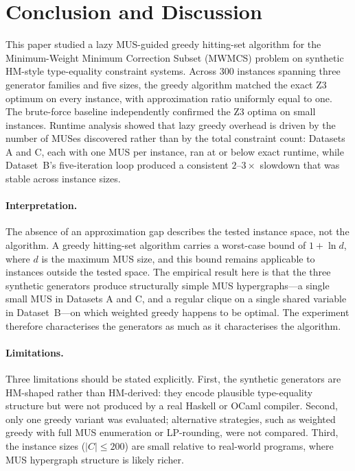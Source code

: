 \section{Conclusion and Discussion}

This paper studied a lazy MUS-guided greedy hitting-set algorithm for the
Minimum-Weight Minimum Correction Subset (MWMCS) problem on synthetic
HM-style type-equality constraint systems. Across 300 instances spanning three
generator families and five sizes, the greedy algorithm matched the exact Z3
optimum on every instance, with approximation ratio uniformly equal to one.
The brute-force baseline independently confirmed the Z3 optima on small
instances. Runtime analysis showed that lazy greedy overhead is driven by the
number of MUSes discovered rather than by the total constraint count: Datasets
A and C, each with one MUS per instance, ran at or below exact runtime, while
Dataset~B's five-iteration loop produced a consistent $2$--$3\times$ slowdown
that was stable across instance sizes.

\paragraph{Interpretation.}
The absence of an approximation gap describes the tested instance space, not
the algorithm. A greedy hitting-set algorithm carries a worst-case bound of
$1 + \ln d$, where $d$ is the maximum MUS size, and this bound remains
applicable to instances outside the tested space. The empirical result here
is that the three synthetic generators produce structurally simple MUS
hypergraphs---a single small MUS in Datasets A and C, and a regular clique
on a single shared variable in Dataset~B---on which weighted greedy happens
to be optimal. The experiment therefore characterises the generators as much
as it characterises the algorithm.

\paragraph{Limitations.}
Three limitations should be stated explicitly. First, the synthetic
generators are HM-shaped rather than HM-derived: they encode plausible
type-equality structure but were not produced by a real Haskell or OCaml
compiler. Second, only one greedy variant was evaluated; alternative
strategies, such as weighted greedy with full MUS enumeration or LP-rounding,
were not compared. Third, the instance sizes ($|C| \le 200$) are small
relative to real-world programs, where MUS hypergraph structure is likely
richer.

